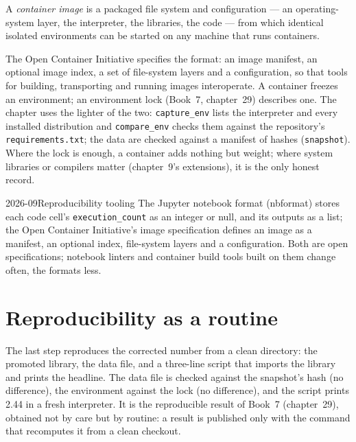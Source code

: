 \begin{definition}\label{def:pl:the-research-environment:container}
A \emph{container image} is a packaged file system and configuration --- an operating-system layer, the interpreter,
the libraries, the code --- from which identical isolated environments can be started on any machine that runs containers.
\end{definition}

The Open Container Initiative specifies the format: an image manifest, an optional image index, a set of file-system layers and a
configuration, so that tools for building, transporting and running images interoperate. A container freezes an environment; an environment
lock (Book~7, chapter~29) describes one. The chapter uses the lighter of the two: \texttt{capture\_env} lists the interpreter and every
installed distribution and \texttt{compare\_env} checks them against the repository's \texttt{requirements.txt}; the data are checked
against a manifest of hashes (\texttt{snapshot}). Where the lock is enough, a container adds nothing but weight; where system libraries or
compilers matter (chapter~9's extensions), it is the only honest record.

\begin{dated}{2026-09}{Reproducibility tooling}\label{dat:pl:the-research-environment:tools}
The Jupyter notebook format (nbformat) stores each code cell's \texttt{execution\_count} as an integer or null, and its outputs as a list;
the Open Container Initiative's image specification defines an image as a manifest, an optional index, file-system layers and a
configuration. Both are open specifications; notebook linters and container build tools built on them change often, the formats less.
\end{dated}

\section{Reproducibility as a routine}

The last step reproduces the corrected number from a clean directory: the promoted library, the data file, and a three-line script that
imports the library and prints the headline. The data file is checked against the snapshot's hash (no difference), the environment against
the lock (no difference), and the script prints 2.44 in a fresh interpreter. It is the reproducible result of Book~7 (chapter~29), obtained
not by care but by routine: a result is published only with the command that recomputes it from a clean checkout.

